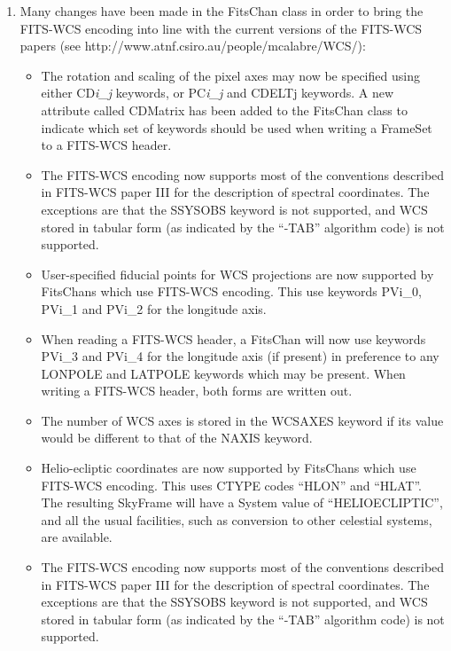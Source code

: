 \documentclass[twoside,11pt]{article}
\newcommand{\htmladdnormallink}[2]{#1}
\begin{document}
\begin{enumerate}

\item Many changes have been made in the FitsChan class in order to bring
the FITS-WCS encoding into line with the current versions of the FITS-WCS
papers (see \htmladdnormallink{http://www.atnf.csiro.au/people/mcalabre/WCS/}
{http://www.atnf.csiro.au/people/mcalabre/WCS/}):

\begin{itemize}

\item The rotation and scaling of the pixel axes may now be specified using
either CD\emph{i\_j} keywords, or PC\emph{i\_j} and CDELTj keywords. A new attribute
called CDMatrix has been added to the FitsChan class to indicate which
set of keywords should be used when writing a FrameSet to a FITS-WCS
header.

\item The FITS-WCS encoding now supports most of the conventions
described in FITS-WCS paper III for the description of spectral
coordinates. The exceptions are that the SSYSOBS keyword is not
supported, and WCS stored in tabular form (as indicated by the ``-TAB'' 
algorithm code) is not supported.


\item User-specified fiducial points for WCS projections are now
supported by FitsChans which use FITS-WCS encoding. This use keywords
PVi\_0, PVi\_1 and PVi\_2 for the longitude axis.

\item  When reading a FITS-WCS header, a FitsChan will now use keywords PVi\_3 
and PVi\_4 for the longitude axis (if present) in preference to any LONPOLE 
and LATPOLE keywords which may be present. When writing a FITS-WCS header, 
both forms are written out.

\item The number of WCS axes is stored in the WCSAXES keyword if its value
would be different to that of the NAXIS keyword.

\item Helio-ecliptic coordinates are now supported by FitsChans which use 
FITS-WCS encoding. This uses CTYPE codes ``HLON'' and ``HLAT''. The
resulting SkyFrame will have a System value of ``HELIOECLIPTIC'', and all
the usual facilities, such as conversion to other celestial systems, are
available.

\item The FITS-WCS encoding now supports most of the conventions
described in FITS-WCS paper III for the description of spectral
coordinates. The exceptions are that the SSYSOBS keyword is not
supported, and WCS stored in tabular form (as indicated by the ``-TAB'' 
algorithm code) is not supported.


\end{itemize}
\end{enumerate}
\end{document}
